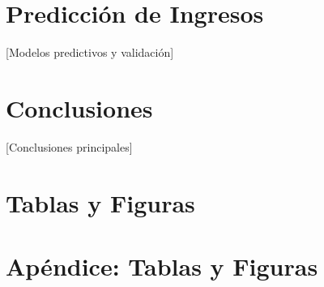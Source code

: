 \documentclass[12pt,a4paper,onecolumn]{article}
\begin{document}
\section{Predicción de Ingresos}
[Modelos predictivos y validación]

\section{Conclusiones}
[Conclusiones principales]


\pagebreak
\singlespacing

\pagebreak

\section*{Tablas y Figuras}


\pagebreak

\appendix
\renewcommand{\theequation}{\Alph{chapter}.\arabic{equation}}

\setcounter{figure}{0}
\setcounter{table}{0}
\makeatletter 
\renewcommand{\thefigure}{A.\@arabic\c@figure}
\renewcommand{\thetable}{A.\@arabic\c@table}

\section{Apéndice: Tablas y Figuras}\label{sec:appendix_tables} 
\end{document}
